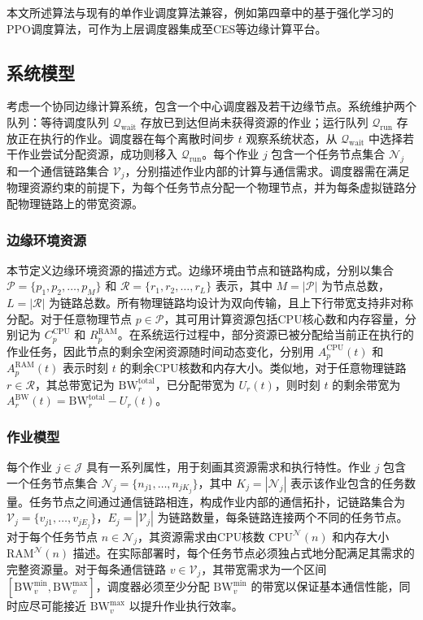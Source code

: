 本文所述算法与现有的单作业调度算法兼容，例如第四章中的基于强化学习的PPO调度算法，可作为上层调度器集成至CES等边缘计算平台。

\subsection{系统模型}

考虑一个协同边缘计算系统，包含一个中心调度器及若干边缘节点。系统维护两个队列：等待调度队列 $\mathcal{Q}_{\text{wait}}$ 存放已到达但尚未获得资源的作业；运行队列 $\mathcal{Q}_{\text{run}}$ 存放正在执行的作业。调度器在每个离散时间步 $t$ 观察系统状态，从 $\mathcal{Q}_{\text{wait}}$ 中选择若干作业尝试分配资源，成功则移入 $\mathcal{Q}_{\text{run}}$。每个作业 $j$ 包含一个任务节点集合 $\mathcal{N}_j$ 和一个通信链路集合 $\mathcal{V}_j$，分别描述作业内部的计算与通信需求。调度器需在满足物理资源约束的前提下，为每个任务节点分配一个物理节点，并为每条虚拟链路分配物理链路上的带宽资源。

\subsubsection{边缘环境资源}

本节定义边缘环境资源的描述方式。边缘环境由节点和链路构成，分别以集合 $\mathcal{P} = \{p_1, p_2, \dots, p_M\}$ 和 $\mathcal{R} = \{r_1, r_2, \dots, r_L\}$ 表示，其中 $M = |\mathcal{P}|$ 为节点总数，$L = |\mathcal{R}|$ 为链路总数。所有物理链路均设计为双向传输，且上下行带宽支持非对称分配。对于任意物理节点 $p \in \mathcal{P}$，其可用计算资源包括CPU核心数和内存容量，分别记为 $C_p^{\text{CPU}}$ 和 $R_p^{\text{RAM}}$。在系统运行过程中，部分资源已被分配给当前正在执行的作业任务，因此节点的剩余空闲资源随时间动态变化，分别用 $A_p^{\text{CPU}}(t)$ 和 $A_p^{\text{RAM}}(t)$ 表示时刻 $t$ 的剩余CPU核数和内存大小。类似地，对于任意物理链路 $r \in \mathcal{R}$，其总带宽记为 $\text{BW}_r^{\text{total}}$，已分配带宽为 $U_r(t)$，则时刻 $t$ 的剩余带宽为 $A_r^{\text{BW}}(t) = \text{BW}_r^{\text{total}} - U_r(t)$。

\subsubsection{作业模型}

每个作业 $j \in \mathcal{J}$ 具有一系列属性，用于刻画其资源需求和执行特性。作业 $j$ 包含一个任务节点集合 $\mathcal{N}_j = \{n_{j1}, \dots, n_{jK_j}\}$，其中 $K_j = |\mathcal{N}_j|$ 表示该作业包含的任务数量。任务节点之间通过通信链路相连，构成作业内部的通信拓扑，记链路集合为 $\mathcal{V}_j = \{v_{j1}, \dots, v_{jE_j}\}$，$E_j = |\mathcal{V}_j|$ 为链路数量，每条链路连接两个不同的任务节点。对于每个任务节点 $n \in \mathcal{N}_j$，其资源需求由CPU核数 $\text{CPU}^\mathcal{N}(n)$ 和内存大小 $\text{RAM}^\mathcal{N}(n)$ 描述。在实际部署时，每个任务节点必须独占式地分配满足其需求的完整资源量。对于每条通信链路 $v \in \mathcal{V}_j$，其带宽需求为一个区间 $[\text{BW}_v^{\min}, \text{BW}_v^{\max}]$，调度器必须至少分配 $\text{BW}_v^{\min}$ 的带宽以保证基本通信性能，同时应尽可能接近 $\text{BW}_v^{\max}$ 以提升作业执行效率。

